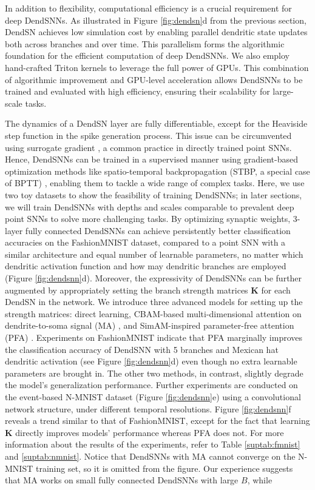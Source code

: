 In addition to flexibility, computational efficiency is a crucial requirement for deep DendSNNs. As illustrated in Figure \ref{fig:dendsn}d from the previous section, DendSN achieves low simulation cost by enabling parallel dendritic state updates both across branches and over time. This parallelism forms the algorithmic foundation for the efficient computation of deep DendSNNs. We also employ hand-crafted Triton kernels \cite{tillet2019triton} to leverage the full power of GPUs. This combination of algorithmic improvement and GPU-level acceleration allows DendSNNs to be trained and evaluated with high efficiency, ensuring their scalability for large-scale tasks.

The dynamics of a DendSN layer are fully differentiable, except for the Heaviside step function in the spike generation process. This issue can be circumvented using surrogate gradient \cite{neftci2019surrogate,zenke2021remarkable}, a common practice in directly trained point SNNs. Hence, DendSNNs can be trained in a supervised manner using gradient-based optimization methods like spatio-temporal backpropagation (STBP, a special case of BPTT) \cite{wu2018stbp}, enabling them to tackle a wide range of complex tasks. Here, we use two toy datasets to show the feasibility of training DendSNNs; in later sections, we will train DendSNNs with depths and scales comparable to prevalent deep point SNNs to solve more challenging tasks. By optimizing synaptic weights, 3-layer fully connected DendSNNs can achieve persistently better classification accuracies on the FashionMNIST \cite{xiao2017fashionmnist} dataset, compared to a point SNN with a similar architecture and equal number of learnable parameters, no matter which dendritic activation function and how may dendritic branches are employed (Figure \ref{fig:dendsnn}d). Moreover, the expressivity of DendSNNs can be further augmented by appropriately setting the branch strength matrices $\mathbf{K}$ for each DendSN in the network. We introduce three advanced models for setting up the strength matrices: direct learning, CBAM-based multi-dimensional attention on dendrite-to-soma signal (MA) \cite{woo2018cbam}, and SimAM-inspired parameter-free attention (PFA) \cite{yang2021simam}. Experiments on FashionMNIST indicate that PFA marginally improves the classification accuracy of DendSNN with 5 branches and Mexican hat dendritic activation (see Figure \ref{fig:dendsnn}d) even though no extra learnable parameters are brought in. The other two methods, in contrast, slightly degrade the model's generalization performance. Further experiments are conducted on the event-based N-MNIST \cite{orchard2015converting} dataset (Figure \ref{fig:dendsnn}e) using a convolutional network structure, under different temporal resolutions. Figure \ref{fig:dendsnn}f reveals a trend similar to that of FashionMNIST, except for the fact that learning $\mathbf{K}$ directly improves models' performance whereas PFA does not. For more information about the results of the experiments, refer to Table \ref{suptab:fmnist} and \ref{suptab:nmnist}. Notice that DendSNNs with MA cannot converge on the N-MNIST training set, so it is omitted from the figure. Our experience suggests that MA works on small fully connected DendSNNs with large $B$, while 